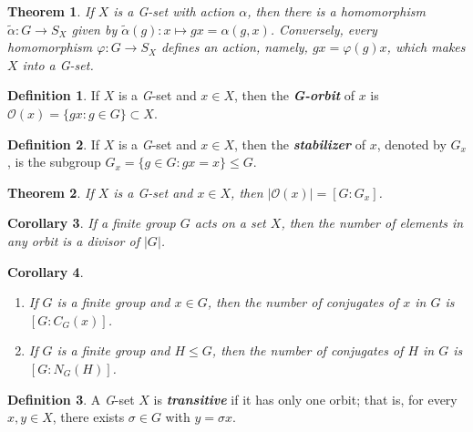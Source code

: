 \documentclass[12pt]{report}
\newtheorem{theorem}{Theorem}[chapter]
\newtheorem{corollary}[theorem]{Corollary}
\theoremstyle{definition}
\newtheorem*{definition}{Definition}
\newcommand{\term}[1]{\textbf{\textit{#1}}}
\begin{document}
\begin{theorem}
	If $X$ is a G-set with action $\alpha$, then there is a homomorphism $\tilde{\alpha}:G\to S_X$ given by $\tilde{\alpha}(g):x\mapsto gx=\alpha(g,x)$. Conversely, every homomorphism $\varphi:G\to S_X$ defines an action, namely, $gx=\varphi(g)x$, which makes $X$ into a G-set.
\end{theorem}

\begin{definition}
	If $X$ is a \textit{G}-set and $x\in X$, then the \term{G-orbit} of $x$ is $\mathcal{O}(x)=\{gx:g\in G\}\subset X$.
\end{definition}

\begin{definition}
	If $X$ is a \textit{G}-set and $x\in X$, then the \term{stabilizer} of $x$, denoted by $G_x$, is the subgroup $G_x=\{g\in G:gx=x\}\leq G$.
\end{definition}

\begin{theorem}
	If $X$ is a \textit{G}-set and $x\in X$, then $|\mathcal{O}(x)|=[G:G_x]$.
\end{theorem}

\begin{corollary}
	If a finite group $G$ acts on a set $X$, then the number of elements in any orbit is a divisor of $|G|$.
\end{corollary}

\begin{corollary}
	\quad
	\begin{enumerate}
		\item If $G$ is a finite group and $x\in G$, then the number of conjugates of $x$ in $G$ is $[G:C_G(x)]$.
		\item If $G$ is a finite group and $H\leq G$, then the number of conjugates of $H$ in $G$ is $[G:N_G(H)]$.
	\end{enumerate}
\end{corollary}

\begin{definition}
	A \textit{G}-set $X$ is \term{transitive} if it has only one orbit; that is, for every $x,y\in X$, there exists $\sigma\in G$ with $y=\sigma x$.
\end{definition}
\end{document}
